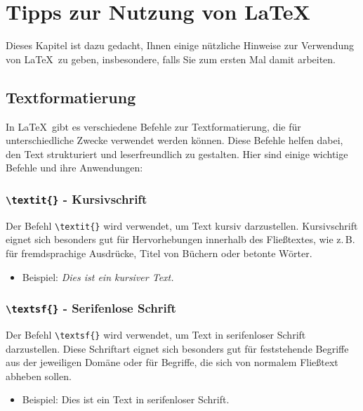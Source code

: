 \chapter{Tipps zur Nutzung von LaTeX}

Dieses Kapitel ist dazu gedacht, Ihnen einige nützliche Hinweise zur Verwendung
von \LaTeX\ zu geben, insbesondere, falls Sie zum ersten Mal damit arbeiten.



\section{Textformatierung}

In \LaTeX\ gibt es verschiedene Befehle zur Textformatierung, die für
unterschiedliche Zwecke verwendet werden können. Diese Befehle helfen dabei, den
Text strukturiert und leserfreundlich zu gestalten. Hier sind einige wichtige
Befehle und ihre Anwendungen:

\subsection{\texttt{\textbackslash textit\{\}} - Kursivschrift}

Der Befehl \texttt{\textbackslash textit\{\}} wird verwendet, um Text kursiv
darzustellen. Kursivschrift eignet sich besonders gut für Hervorhebungen
innerhalb des Fließtextes, wie z.\,B. für fremdsprachige Ausdrücke, Titel von
Büchern oder betonte Wörter.

\begin{itemize}
    \item Beispiel: \textit{Dies ist ein kursiver Text.}
\end{itemize}

\subsection{\texttt{\textbackslash textsf\{\}} - Serifenlose Schrift}

Der Befehl \texttt{\textbackslash textsf\{\}} wird verwendet, um Text in
serifenloser Schrift darzustellen. Diese Schriftart eignet sich besonders gut
für feststehende Begriffe aus der jeweiligen Domäne oder für Begriffe, die sich
von normalem Fließtext abheben sollen.

\begin{itemize}
    \item Beispiel: \textsf{Dies ist ein Text in serifenloser Schrift.}
\end{itemize}

